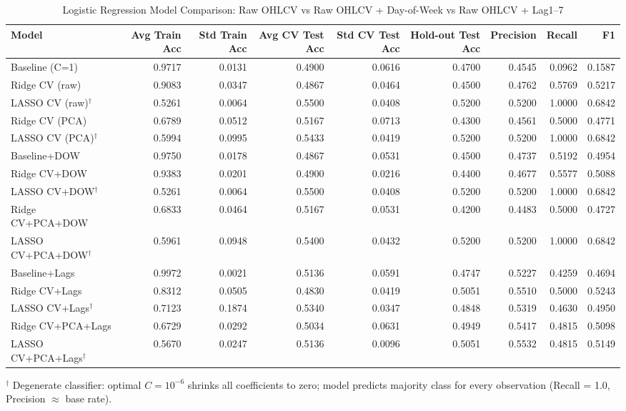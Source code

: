 \begin{table}[htbp]
\centering
\caption{Logistic Regression Model Comparison: Raw OHLCV vs Raw OHLCV + Day-of-Week vs Raw OHLCV + Lag1--7}
\label{tab:base_logistic_comparison}
\begin{tabular}{lrrrrrrrr}
\toprule
Model & Avg Train Acc & Std Train Acc & Avg CV Test Acc & Std CV Test Acc & Hold-out Test Acc & Precision & Recall & F1 \\
\midrule
Baseline (C=1) & 0.9717 & 0.0131 & 0.4900 & 0.0616 & 0.4700 & 0.4545 & 0.0962 & 0.1587 \\
Ridge CV (raw) & 0.9083 & 0.0347 & 0.4867 & 0.0464 & 0.4500 & 0.4762 & 0.5769 & 0.5217 \\
LASSO CV (raw)$^\dagger$ & 0.5261 & 0.0064 & 0.5500 & 0.0408 & 0.5200 & 0.5200 & 1.0000 & 0.6842 \\
Ridge CV (PCA) & 0.6789 & 0.0512 & 0.5167 & 0.0713 & 0.4300 & 0.4561 & 0.5000 & 0.4771 \\
LASSO CV (PCA)$^\dagger$ & 0.5994 & 0.0995 & 0.5433 & 0.0419 & 0.5200 & 0.5200 & 1.0000 & 0.6842 \\
\midrule
Baseline+DOW & 0.9750 & 0.0178 & 0.4867 & 0.0531 & 0.4500 & 0.4737 & 0.5192 & 0.4954 \\
Ridge CV+DOW & 0.9383 & 0.0201 & 0.4900 & 0.0216 & 0.4400 & 0.4677 & 0.5577 & 0.5088 \\
LASSO CV+DOW$^\dagger$ & 0.5261 & 0.0064 & 0.5500 & 0.0408 & 0.5200 & 0.5200 & 1.0000 & 0.6842 \\
Ridge CV+PCA+DOW & 0.6833 & 0.0464 & 0.5167 & 0.0531 & 0.4200 & 0.4483 & 0.5000 & 0.4727 \\
LASSO CV+PCA+DOW$^\dagger$ & 0.5961 & 0.0948 & 0.5400 & 0.0432 & 0.5200 & 0.5200 & 1.0000 & 0.6842 \\
\midrule
Baseline+Lags & 0.9972 & 0.0021 & 0.5136 & 0.0591 & 0.4747 & 0.5227 & 0.4259 & 0.4694 \\
Ridge CV+Lags & 0.8312 & 0.0505 & 0.4830 & 0.0419 & 0.5051 & 0.5510 & 0.5000 & 0.5243 \\
LASSO CV+Lags$^\dagger$ & 0.7123 & 0.1874 & 0.5340 & 0.0347 & 0.4848 & 0.5319 & 0.4630 & 0.4950 \\
Ridge CV+PCA+Lags & 0.6729 & 0.0292 & 0.5034 & 0.0631 & 0.4949 & 0.5417 & 0.4815 & 0.5098 \\
LASSO CV+PCA+Lags$^\dagger$ & 0.5670 & 0.0247 & 0.5136 & 0.0096 & 0.5051 & 0.5532 & 0.4815 & 0.5149 \\
\bottomrule
\end{tabular}
\par\smallskip
\footnotesize $^\dagger$ Degenerate classifier: optimal $C = 10^{-6}$ shrinks all coefficients to zero; model predicts majority class for every observation (Recall = 1.0, Precision $\approx$ base rate).
\end{table}
